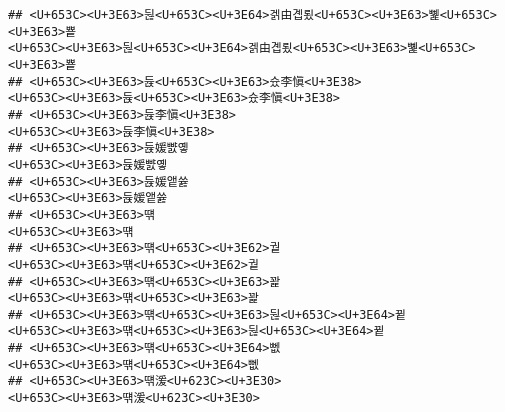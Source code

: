 \documentclass[]{article}
\begin{document}
\begin{verbatim}
## <U+653C><U+3E63>뒪<U+653C><U+3E64>겕由곕룄<U+653C><U+3E63>뼱<U+653C><U+3E63>뿉                                                                                                                 <U+653C><U+3E63>뒪<U+653C><U+3E64>겕由곕룄<U+653C><U+3E63>뼱<U+653C><U+3E63>뿉
## <U+653C><U+3E63>듅<U+653C><U+3E63>슜李愼<U+3E38>                                                                                                                                                           <U+653C><U+3E63>듅<U+653C><U+3E63>슜李愼<U+3E38>
## <U+653C><U+3E63>듅李愼<U+3E38>                                                                                                                                                                                   <U+653C><U+3E63>듅李愼<U+3E38>
## <U+653C><U+3E63>듅媛뺤옣                                                                                                                                                                                         <U+653C><U+3E63>듅媛뺤옣
## <U+653C><U+3E63>듅媛앹쓣                                                                                                                                                                                         <U+653C><U+3E63>듅媛앹쓣
## <U+653C><U+3E63>떆                                                                                                                                                                                                     <U+653C><U+3E63>떆
## <U+653C><U+3E63>떆<U+653C><U+3E62>궡                                                                                                                                                                             <U+653C><U+3E63>떆<U+653C><U+3E62>궡
## <U+653C><U+3E63>떆<U+653C><U+3E63>꽕                                                                                                                                                                             <U+653C><U+3E63>떆<U+653C><U+3E63>꽕
## <U+653C><U+3E63>떆<U+653C><U+3E63>뒪<U+653C><U+3E64>뀥                                                                                                                                                     <U+653C><U+3E63>떆<U+653C><U+3E63>뒪<U+653C><U+3E64>뀥
## <U+653C><U+3E63>떆<U+653C><U+3E64>뻾                                                                                                                                                                             <U+653C><U+3E63>떆<U+653C><U+3E64>뻾
## <U+653C><U+3E63>떆湲<U+623C><U+3E30>                                                                                                                                                                             <U+653C><U+3E63>떆湲<U+623C><U+3E30>

\end{verbatim}
\end{document}
